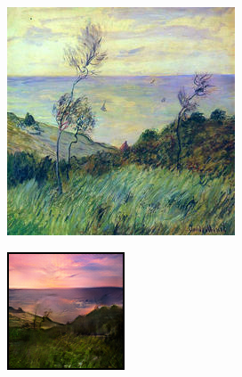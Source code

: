 \documentclass{article}
\begin{document}
\begin{figure}[H]
    \begin{subfigure}{.112\textwidth}
        \centering
        \includegraphics[width=\linewidth]{00170.jpg}
    \end{subfigure}%
    \begin{subfigure}{.112\textwidth}
        \centering
        \includegraphics[width=\linewidth]{0017.png}

\end{subfigure}
\end{figure}
\end{document}
